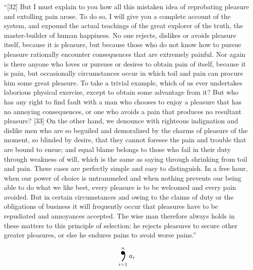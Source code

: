 \documentclass[letterpaper]{amsart}
\begin{document}
\textdbend
``[32] But I must explain to you how all this mistaken idea of reprobating pleasure and extolling pain arose.
To do so, I will give you a complete account of the system, and expound the actual teachings of the great explorer of the truth, the master-builder of human happiness.
No one rejects, dislikes or avoids pleasure itself, because it is pleasure, but because those who do not know how to pursue pleasure rationally encounter consequences that are extremely painful.
Nor again is there anyone who loves or pursues or desires to obtain pain of itself, because it is pain, but occasionally circumstances occur in which toil and pain can procure him some great pleasure.
To take a trivial example, which of us ever undertakes laborious physical exercise, except to obtain some advantage from it?
But who has any right to find fault with a man who chooses to enjoy a pleasure that has no annoying consequences, or one who avoids a pain that produces no resultant pleasure?
[33] On the other hand, we denounce with righteous indignation and dislike men who are so beguiled and demoralized by the charms of pleasure of the moment, so blinded by desire, that they cannot foresee the pain and trouble that are bound to ensue; and equal blame belongs to those who fail in their duty through weakness of will, which is the same as saying through shrinking from toil and pain.
These cases are perfectly simple and easy to distinguish.
In a free hour, when our power of choice is untrammeled and when nothing prevents our being able to do what we like best, every pleasure is to be welcomed and every pain avoided.
But in certain circumstances and owing to the claims of duty or the obligations of business it will frequently occur that pleasures have to be repudiated and annoyances accepted.
The wise man therefore always holds in these matters to this principle of selection: he rejects pleasures to secure other greater pleasures, or else he endures pains to avoid worse pains.''~\cite{book:lorem_ipsum}

\[
  \bigcomma_{i=1}^n a_{i}
\]

\printbibliography
\end{document}
